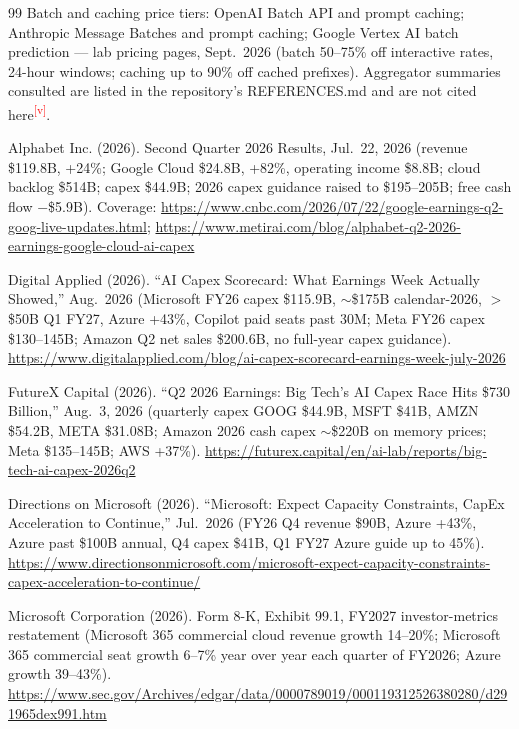 \documentclass[11pt,letterpaper]{article}
\newcommand{\verify}{\textsuperscript{\textcolor{red}{[v]}}}
\begin{document}
\begin{thebibliography}{99}
Batch and caching price tiers: OpenAI Batch API and prompt caching; Anthropic Message Batches and prompt caching; Google Vertex AI batch prediction --- lab pricing pages, Sept.~2026 (batch 50--75\% off interactive rates, 24-hour windows; caching up to 90\% off cached prefixes). Aggregator summaries consulted are listed in the repository's REFERENCES.md and are not cited here\verify.

Alphabet Inc. (2026). Second Quarter 2026 Results, Jul.~22, 2026 (revenue \$119.8B, +24\%; Google Cloud \$24.8B, +82\%, operating income \$8.8B; cloud backlog \$514B; capex \$44.9B; 2026 capex guidance raised to \$195--205B; free cash flow $-$\$5.9B). Coverage: \url{https://www.cnbc.com/2026/07/22/google-earnings-q2-goog-live-updates.html}; \url{https://www.metirai.com/blog/alphabet-q2-2026-earnings-google-cloud-ai-capex}

Digital Applied (2026). ``AI Capex Scorecard: What Earnings Week Actually Showed,'' Aug.~2026 (Microsoft FY26 capex \$115.9B, $\sim$\$175B calendar-2026, $>$\$50B Q1 FY27, Azure +43\%, Copilot paid seats past 30M; Meta FY26 capex \$130--145B; Amazon Q2 net sales \$200.6B, no full-year capex guidance). \url{https://www.digitalapplied.com/blog/ai-capex-scorecard-earnings-week-july-2026}

FutureX Capital (2026). ``Q2 2026 Earnings: Big Tech's AI Capex Race Hits \$730 Billion,'' Aug.~3, 2026 (quarterly capex GOOG \$44.9B, MSFT \$41B, AMZN \$54.2B, META \$31.08B; Amazon 2026 cash capex $\sim$\$220B on memory prices; Meta \$135--145B; AWS +37\%). \url{https://futurex.capital/en/ai-lab/reports/big-tech-ai-capex-2026q2}

Directions on Microsoft (2026). ``Microsoft: Expect Capacity Constraints, CapEx Acceleration to Continue,'' Jul.~2026 (FY26 Q4 revenue \$90B, Azure +43\%, Azure past \$100B annual, Q4 capex \$41B, Q1 FY27 Azure guide up to 45\%). \url{https://www.directionsonmicrosoft.com/microsoft-expect-capacity-constraints-capex-acceleration-to-continue/}

Microsoft Corporation (2026). Form 8-K, Exhibit 99.1, FY2027 investor-metrics restatement (Microsoft 365 commercial cloud revenue growth 14--20\%; Microsoft 365 commercial seat growth 6--7\% year over year each quarter of FY2026; Azure growth 39--43\%). \url{https://www.sec.gov/Archives/edgar/data/0000789019/000119312526380280/d291965dex991.htm}


\end{thebibliography}
\end{document}
